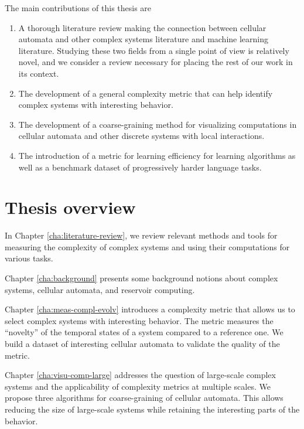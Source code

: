 The main contributions of this thesis are
\begin{enumerate}
  \item A thorough literature review making the connection between cellular
        automata and other complex systems literature and machine learning
        literature. Studying these two fields from a single point of view is
        relatively novel, and we consider a review necessary for placing the
        rest of our work in its context.

  \item The development of a general complexity metric that can help identify
        complex systems with interesting behavior.

  \item The development of a coarse-graining method for visualizing computations
        in cellular automata and other discrete systems with local interactions.

  \item The introduction of a metric for learning efficiency for learning
        algorithms as well as a benchmark dataset of progressively harder
        language tasks.
\end{enumerate}

\section{Thesis overview}

In Chapter \ref{cha:literature-review}, we review relevant methods and tools for
measuring the complexity of complex systems and using their computations for
various tasks.

Chapter \ref{cha:background} presents some background notions about complex
systems, cellular automata, and reservoir computing.

Chapter \ref{cha:meas-compl-evolv} introduces a complexity metric that allows us 
to select complex systems with interesting behavior. The metric measures the
``novelty'' of the temporal states of a system compared to a reference one. We
build a dataset of interesting cellular automata to validate the quality of the
metric.

Chapter \ref{cha:visu-comp-large} addresses the question of large-scale complex
systems and the applicability of complexity metrics at multiple scales. We
propose three algorithms for coarse-graining of cellular automata. This allows
reducing the size of large-scale systems while retaining the interesting parts
of the behavior.

